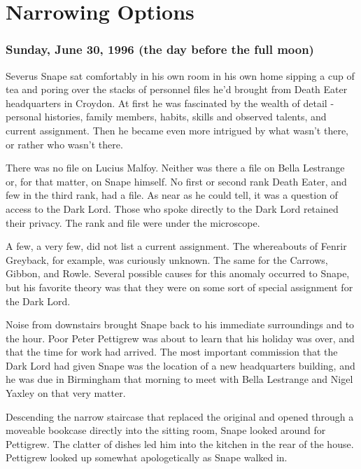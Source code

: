 
\chapter{Narrowing Options}

\subsection{Sunday, June 30, 1996 (the day before the full moon)}

Severus Snape sat comfortably in his own room in his own home sipping a cup of tea and poring over the stacks of personnel files he'd brought from Death Eater headquarters in Croydon. At first he was fascinated by the wealth of detail - personal histories, family members, habits, skills and observed talents, and current assignment. Then he became even more intrigued by what wasn't there, or rather who wasn't there.

There was no file on Lucius Malfoy. Neither was there a file on Bella Lestrange or, for that matter, on Snape himself. No first or second rank Death Eater, and few in the third rank, had a file. As near as he could tell, it was a question of access to the Dark Lord. Those who spoke directly to the Dark Lord retained their privacy. The rank and file were under the microscope.

A few, a very few, did not list a current assignment. The whereabouts of Fenrir Greyback, for example, was curiously unknown. The same for the Carrows, Gibbon, and Rowle. Several possible causes for this anomaly occurred to Snape, but his favorite theory was that they were on some sort of special assignment for the Dark Lord.

Noise from downstairs brought Snape back to his immediate surroundings and to the hour. Poor Peter Pettigrew was about to learn that his holiday was over, and that the time for work had arrived. The most important commission that the Dark Lord had given Snape was the location of a new headquarters building, and he was due in Birmingham that morning to meet with Bella Lestrange and Nigel Yaxley on that very matter.

Descending the narrow staircase that replaced the original and opened through a moveable bookcase directly into the sitting room, Snape looked around for Pettigrew. The clatter of dishes led him into the kitchen in the rear of the house. Pettigrew looked up somewhat apologetically as Snape walked in.

